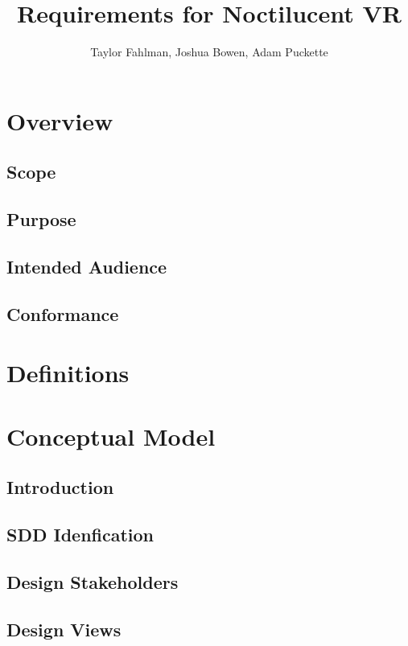 \documentclass{article}
\begin{document}
\title {Requirements for Noctilucent VR}
\author {Taylor Fahlman, Joshua Bowen, Adam Puckette}

\maketitle

\abstract

\newpage
\thispagestyle{empty}
\mbox{}

\section{Overview}

\subsection{Scope}
\subsection{Purpose}
\subsection{Intended Audience}
\subsection{Conformance}

\section{Definitions}

\section{Conceptual Model}

\subsection{Introduction}
\subsection{SDD Idenfication}
\subsection{Design Stakeholders}
\subsection{Design Views}
\end{document}
